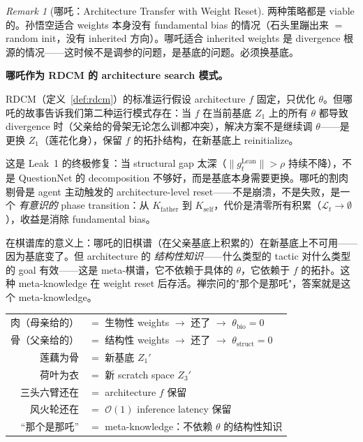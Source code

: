 \documentclass[11pt,a4paper]{article}
\theoremstyle{definition}
\theoremstyle{remark}
\newtheorem{remark}[theorem]{Remark}
\begin{document}
\begin{remark}[哪吒：Architecture Transfer with Weight Reset]
两种策略都是 viable 的。孙悟空适合 weights 本身没有 fundamental bias 的情况（石头里蹦出来 $=$ random init，没有 inherited 方向）。哪吒适合 inherited weights 是 divergence 根源的情况——这时候不是调参的问题，是基底的问题。必须换基底。

\medskip

{\color{violet!70!black} \textbf{哪吒作为 RDCM 的 architecture search 模式。}}

RDCM（定义~\ref{def:rdcm}）的标准运行假设 architecture $f$ 固定，只优化 $\theta$。但哪吒的故事告诉我们第二种运行模式存在：当 $f$ 在当前基底 $Z_1$ 上的所有 $\theta$ 都导致 divergence 时（父亲给的骨架无论怎么训都冲突），解决方案不是继续调 $\theta$——是更换 $Z_1$（莲花化身），保留 $f$ 的拓扑结构，在新基底上 reinitialize。

这是 Leak~1 的终极修复：当 structural gap 太深（$\|g_t^{\mathrm{Lean}}\| > \rho$ 持续不降），不是 QuestionNet 的 decomposition 不够好，而是基底本身需要更换。哪吒的割肉剔骨是 agent 主动触发的 architecture-level reset——不是崩溃，不是失败，是一个 \emph{有意识的} phase transition：从 $K_{\mathrm{father}}$ 到 $K_{\mathrm{self}}$，代价是清零所有积累（$\mathcal{L}_t \to \emptyset$），收益是消除 fundamental bias。

在棋谱库的意义上：哪吒的旧棋谱（在父亲基底上积累的）在新基底上不可用——因为基底变了。但 architecture 的 \emph{结构性知识}——什么类型的 tactic 对什么类型的 goal 有效——这是 meta-棋谱，它不依赖于具体的 $\theta$，它依赖于 $f$ 的拓扑。这种 meta-knowledge 在 weight reset 后存活。禅宗问的"那个是那吒"，答案就是这个 meta-knowledge。

\begin{center}
\small
\begin{tabular}{rl}
{\color{magenta!70!black} 肉（母亲给的）} & $=$ 生物性 weights $\to$ 还了 $\to$ $\theta_{\mathrm{bio}} = 0$ \\
{\color{magenta!70!black} 骨（父亲给的）} & $=$ 结构性 weights $\to$ 还了 $\to$ $\theta_{\mathrm{struct}} = 0$ \\
{\color{green!50!black} 莲藕为骨} & $=$ 新基底 $Z_1'$ \\
{\color{green!50!black} 荷叶为衣} & $=$ 新 scratch space $Z_3'$ \\
{\color{blue!70!black} 三头六臂还在} & $=$ architecture $f$ 保留 \\
{\color{blue!70!black} 风火轮还在} & $=$ $\mathcal{O}(1)$ inference latency 保留 \\
{\color{violet!70!black} ``那个是那吒''} & $=$ meta-knowledge：不依赖 $\theta$ 的结构性知识 \\
\end{tabular}
\end{center}
\end{remark}
\end{document}
